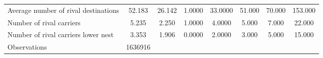 \begin{table}[htbp]
\begin{tabular}{l*{1}{ccccccc}}
Average number of rival destinations&      52.183&      26.142&      1.0000&     33.0000&      51.000&      70.000&     153.000\\
Number of rival carriers&       5.235&       2.250&      1.0000&      4.0000&       5.000&       7.000&      22.000\\
Number of rival carriers lower nest&       3.353&       1.906&      0.0000&      2.0000&       3.000&       5.000&      15.000\\
\midrule
Observations        &     1636916&            &            &            &            &            &            \\
\bottomrule
\end{tabular}
\end{table}

